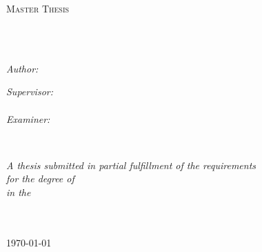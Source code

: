 \documentclass[
11pt, %
oneside, %
english, %
onehalfspacing, %
nolistspacing, %
parskip, %
headsepline, %
]{MastersDoctoralThesis} %
\author{Bosse \textsc{Sottmann}} %
\begin{document}
\frontmatter %

\pagestyle{plain} %


\begin{titlepage}
\begin{center}

\vspace*{.06\textheight}
{\scshape\LARGE \univname\par}\vspace{1.5cm} %
\textsc{\Large Master Thesis}\\[0.5cm] %

\HRule \\[0.4cm] %
{\huge \bfseries \ttitle\par}\vspace{0.4cm} %
\HRule \\[1.5cm] %
 
\begin{minipage}[t]{0.4\textwidth}
\begin{flushleft} \large
\emph{Author:}\\
{\authorname}
\end{flushleft}
\end{minipage}
\begin{minipage}[t]{0.4\textwidth}
\begin{flushright} \large
\emph{Supervisor:} \\
{\supname}\\
\vspace{0.5cm}
\emph{Examiner:}\\
{\examname}
\end{flushright}
\end{minipage}\\[3cm]
 
\vfill

\large \textit{A thesis submitted in partial fulfillment of the requirements\\ for the degree of \degreename}\\[0.3cm] %
\textit{in the}\\[0.4cm]
\deptname\\\facname\\[2cm] %
 
\vfill

{\large \today}\\[4cm] %
 
\vfill
\end{center}
\end{titlepage}
\end{document}

